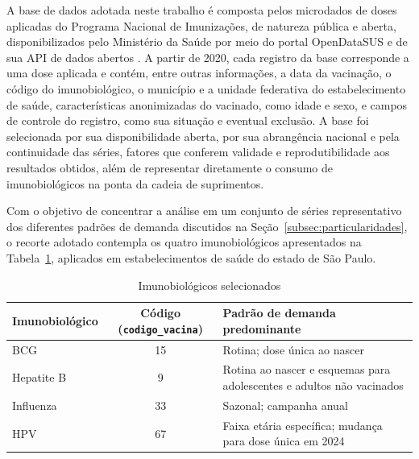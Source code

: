 \documentclass[
    12pt,
    openright,
    oneside,
    a4paper,
    english,
    brazil
]{abntex2}
\begin{document}
A base de dados adotada neste trabalho é composta pelos microdados de doses aplicadas do Programa Nacional de Imunizações, de natureza pública e aberta, disponibilizados pelo Ministério da Saúde por meio do portal OpenDataSUS e de sua API de dados abertos \cite{BrasilPNIDados}. A partir de 2020, cada registro da base corresponde a uma dose aplicada e contém, entre outras informações, a data da vacinação, o código do imunobiológico, o município e a unidade federativa do estabelecimento de saúde, características anonimizadas do vacinado, como idade e sexo, e campos de controle do registro, como sua situação e eventual exclusão. A base foi selecionada por sua disponibilidade aberta, por sua abrangência nacional e pela continuidade das séries, fatores que conferem validade e reprodutibilidade aos resultados obtidos, além de representar diretamente o consumo de imunobiológicos na ponta da cadeia de suprimentos.

Com o objetivo de concentrar a análise em um conjunto de séries representativo dos diferentes padrões de demanda discutidos na Seção~\ref{subsec:particularidades}, o recorte adotado contempla os quatro imunobiológicos apresentados na Tabela~\ref{tab:imunobiologicos}, aplicados em estabelecimentos de saúde do estado de São Paulo.

\begin{table}[htb]
    \centering
    \caption{Imunobiológicos selecionados}
    \label{tab:imunobiologicos}
    \begin{tabularx}{\textwidth}{l|c|>{\raggedright\arraybackslash}X}
        \toprule
        \textbf{Imunobiológico} & \textbf{Código (\texttt{codigo\_vacina})} & \textbf{Padrão de demanda predominante} \\
        \midrule
        BCG & 15 & Rotina; dose única ao nascer \\
        Hepatite B & 9 & Rotina ao nascer e esquemas para adolescentes e adultos não vacinados \\
        Influenza & 33 & Sazonal; campanha anual \\
        HPV & 67 & Faixa etária específica; mudança para dose única em 2024 \\
        \bottomrule
    \end{tabularx}
\end{table}
\end{document}
